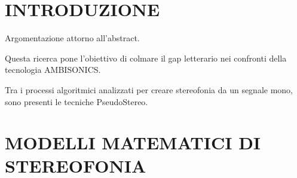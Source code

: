 \newcommand{\mylanguages}{english,italian} %
\newcommand{\mytitle}{Stereophonic Mathematical Models}
\newcommand{\mysubtitle}{Stereophonic Mathematical Models}
\newcommand{\authorone}{Perla Catucci}
\newcommand{\institutione}{Conservatorio N. Piccinni di Bari}
\newcommand{\emailone}{perlacatucci150 @ gmail.com}
\newcommand{\authortwo}{Michele Ruzzi}
\newcommand{\institutiontwo}{Conservatorio N. Piccinni di Bari}
\newcommand{\emailtwo}{m.ruzzi @ icloud.com} %
\newcommand{\authorthree}{Giuseppe Silvi}
\newcommand{\institutionthree}{Conservatorio N. Piccinni di Bari}
\newcommand{\emailthree}{grammaton @ me.com} %


\maketitle
\thispagestyle{empty}
\section*{INTRODUZIONE}
Argomentazione attorno all'abstract.

Questa ricerca pone l'obiettivo di colmare il gap letterario nei confronti
della tecnologia AMBISONICS.

Tra i processi algoritmici analizzati per creare stereofonia da un segnale mono,
sono presenti le tecniche PseudoStereo.
\section*{MODELLI MATEMATICI DI STEREOFONIA}

